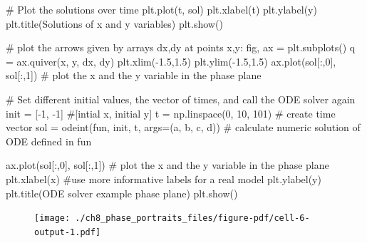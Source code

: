 \documentclass[
  letterpaper,
  DIV=11,
  numbers=noendperiod]{scrreprt}
\newenvironment{Shaded}{\begin{snugshade}}{\end{snugshade}}
\newcommand{\CommentTok}[1]{\textcolor[rgb]{0.37,0.37,0.37}{#1}}
\newcommand{\DecValTok}[1]{\textcolor[rgb]{0.68,0.00,0.00}{#1}}
\newcommand{\FloatTok}[1]{\textcolor[rgb]{0.68,0.00,0.00}{#1}}
\newcommand{\NormalTok}[1]{\textcolor[rgb]{0.00,0.23,0.31}{#1}}
\newcommand{\OperatorTok}[1]{\textcolor[rgb]{0.37,0.37,0.37}{#1}}
\newcommand{\StringTok}[1]{\textcolor[rgb]{0.13,0.47,0.30}{#1}}
\begin{document}
\begin{Shaded}
\begin{Highlighting}[]
\CommentTok{\# Plot the solutions over time}
\NormalTok{plt.plot(t, sol)}
\NormalTok{plt.xlabel(}\StringTok{\textquotesingle{}t\textquotesingle{}}\NormalTok{)}
\NormalTok{plt.ylabel(}\StringTok{\textquotesingle{}y\textquotesingle{}}\NormalTok{)}
\NormalTok{plt.title(}\StringTok{\textquotesingle{}Solutions of x and y variables\textquotesingle{}}\NormalTok{)}
\NormalTok{plt.show()}

    
\CommentTok{\# plot the arrows given by arrays dx,dy at points x,y:}
\NormalTok{fig, ax }\OperatorTok{=}\NormalTok{ plt.subplots()}
\NormalTok{q }\OperatorTok{=}\NormalTok{ ax.quiver(x, y, dx, dy)}
\NormalTok{plt.xlim(}\OperatorTok{{-}}\FloatTok{1.5}\NormalTok{,}\FloatTok{1.5}\NormalTok{)}
\NormalTok{plt.ylim(}\OperatorTok{{-}}\FloatTok{1.5}\NormalTok{,}\FloatTok{1.5}\NormalTok{)}
\NormalTok{ax.plot(sol[:,}\DecValTok{0}\NormalTok{], sol[:,}\DecValTok{1}\NormalTok{]) }\CommentTok{\# plot the x and the y variable in the phase plane}

\CommentTok{\# Set different initial values, the vector of times, and call the ODE solver again}
\NormalTok{init }\OperatorTok{=}\NormalTok{ [}\OperatorTok{{-}}\DecValTok{1}\NormalTok{, }\OperatorTok{{-}}\DecValTok{1}\NormalTok{] }\CommentTok{\#[intial x, initial y]}
\NormalTok{t }\OperatorTok{=}\NormalTok{ np.linspace(}\DecValTok{0}\NormalTok{, }\DecValTok{10}\NormalTok{, }\DecValTok{101}\NormalTok{) }\CommentTok{\# create time vector }
\NormalTok{sol }\OperatorTok{=}\NormalTok{ odeint(fun, init, t, args}\OperatorTok{=}\NormalTok{(a, b, c, d)) }\CommentTok{\# calculate numeric solution of ODE defined in fun}

\NormalTok{ax.plot(sol[:,}\DecValTok{0}\NormalTok{], sol[:,}\DecValTok{1}\NormalTok{]) }\CommentTok{\# plot the x and the y variable in the phase plane}
\NormalTok{plt.xlabel(}\StringTok{\textquotesingle{}x\textquotesingle{}}\NormalTok{) }\CommentTok{\#use more informative labels for a real model}
\NormalTok{plt.ylabel(}\StringTok{\textquotesingle{}y\textquotesingle{}}\NormalTok{)}
\NormalTok{plt.title(}\StringTok{\textquotesingle{}ODE solver example phase plane\textquotesingle{}}\NormalTok{)}
\NormalTok{plt.show()}
\end{Highlighting}
\end{Shaded}

\begin{figure}[H]

{\centering \texttt{[image: ./ch8\_phase\_portraits\_files/figure-pdf/cell-6-output-1.pdf]}

}

\end{figure}
\end{document}
